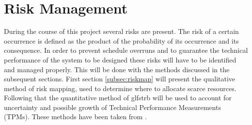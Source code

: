 \section{Risk Management}\label{cha:plan}
During the course of this project several risks are present. The risk of a certain occurrence is defined as the product of the probability of its occurrence and its consequence. In order to prevent schedule overruns and to guarantee the technical performance of the system to be designed these risks will have to be identified and managed properly. This will be done with the methods discussed in the subsequent sections. First section \ref{subsec:riskmap} will present the qualitative method of risk mapping, used to determine where to allocate scarce resources. Following that the quantitative method of glfs{trb} will be used to account for uncertainty and possible growth of Technical Performance Measurements (TPMs). These methods have been taken from \cite{SEAD}.

